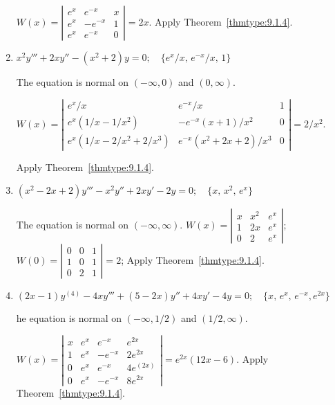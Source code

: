 \documentclass{ximera}
\begin{document}
\begin{problem}
\begin{enumerate}
\begin{solution}
$W(x)=
\left|\begin{array}{cccc}e^x&e^{-x}&x\\e^x&-e^{-x}&1\\
e^x&e^{-x}&0\end{array}\right|=2x$. Apply Theorem~\ref{thmtype:9.1.4}.
\end{solution}

\item $x^2y'''+2xy''-(x^2+2)y=0;  \quad\{e^x/ x,\,e^{-x}/
x,\,1\}$

\begin{solution}
The equation is normal on $(-\infty,0)$ and $(0,\infty)$.

$W(x)=
\left|\begin{array}{cccc}e^x/x&e^{-x}/x&1\\
e^x(1/x-1/x^2)&-e^{-x}(x+1)/x^2&0\\e^x(1/x-2/x^2
+2/x^3)&e^{-x}(x^2+2x+2)/x^3&0\end{array}\right|=2/x^2$. 

Apply Theorem~\ref{thmtype:9.1.4}.
\end{solution}

\item $(x^2-2x+2)y'''-x^2y''+2xy'-2y=0;  \quad \{x,\,x^2,\,e^x\}$

\begin{solution}
The equation is normal on $(-\infty,\infty)$.
$W(x)=
\left|\begin{array}{cccc}x&x^2&e^x\\1&2x&e^x\\0&2&e^x\end{array}\right|$;
$W(0)=
\left|\begin{array}{cccc}0&0&1\\1&0&1\\0&2&1\end{array}\right|=2$; Apply Theorem~\ref{thmtype:9.1.4}.
\end{solution}

\item
$(2x-1)y^{(4)}-4xy'''+(5-2x)y''+4xy'-4y=0;
\quad\{x,\,e^x,\,e^{-x},e^{2x}\}$

\begin{solution}
he equation is normal on $(-\infty,1/2)$ and $(1/2,\infty)$.

$W(x)=
\left|\begin{array}{cccc}x&e^x&e^{-x}&e^{2x}\\
1&e^x&-e^{-x}&2e^{2x}\\0&e^x&e^{-x}&4e^(
2x)\\0&e^x&-e^{-x}&8e^{2x}\end{array}\right|
=e^{2x}(12x-6)$. Apply Theorem~\ref{thmtype:9.1.4}.
\end{solution}


\end{enumerate}
\end{problem}
\end{document}

